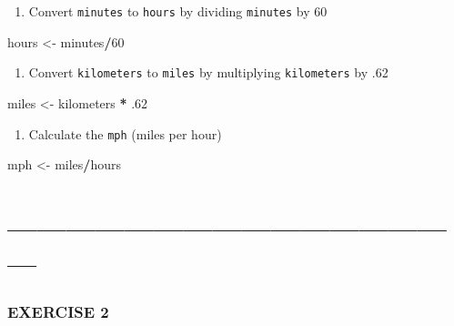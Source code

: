 \documentclass[]{article}
\newenvironment{Shaded}{\begin{snugshade}}{\end{snugshade}}
\newcommand{\DecValTok}[1]{\textcolor[rgb]{0.00,0.00,0.81}{#1}}
\newcommand{\StringTok}[1]{\textcolor[rgb]{0.31,0.60,0.02}{#1}}
\newcommand{\OperatorTok}[1]{\textcolor[rgb]{0.81,0.36,0.00}{\textbf{#1}}}
\newcommand{\NormalTok}[1]{#1}
\providecommand{\tightlist}{%
  \setlength{\itemsep}{0pt}\setlength{\parskip}{0pt}}
\begin{document}
\begin{enumerate}
\def\labelenumi{\arabic{enumi}.}
\setcounter{enumi}{2}
\tightlist
\item
  Convert \texttt{minutes} to \texttt{hours} by dividing
  \texttt{minutes} by 60
\end{enumerate}

\begin{Shaded}
\begin{Highlighting}[]
\NormalTok{hours <-}\StringTok{ }\NormalTok{minutes}\OperatorTok{/}\DecValTok{60}
\end{Highlighting}
\end{Shaded}

\begin{enumerate}
\def\labelenumi{\arabic{enumi}.}
\setcounter{enumi}{3}
\tightlist
\item
  Convert \texttt{kilometers} to \texttt{miles} by multiplying
  \texttt{kilometers} by .62
\end{enumerate}

\begin{Shaded}
\begin{Highlighting}[]
\NormalTok{miles <-}\StringTok{ }\NormalTok{kilometers }\OperatorTok{*}\StringTok{ }\NormalTok{.}\DecValTok{62}
\end{Highlighting}
\end{Shaded}

\begin{enumerate}
\def\labelenumi{\arabic{enumi}.}
\setcounter{enumi}{4}
\tightlist
\item
  Calculate the \texttt{mph} (miles per hour)
\end{enumerate}

\begin{Shaded}
\begin{Highlighting}[]
\NormalTok{mph <-}\StringTok{ }\NormalTok{miles}\OperatorTok{/}\NormalTok{hours}
\end{Highlighting}
\end{Shaded}

\section{------------------------------------------------}\label{section}

\subsubsection{EXERCISE 2}\label{exercise-2}
\end{document}
